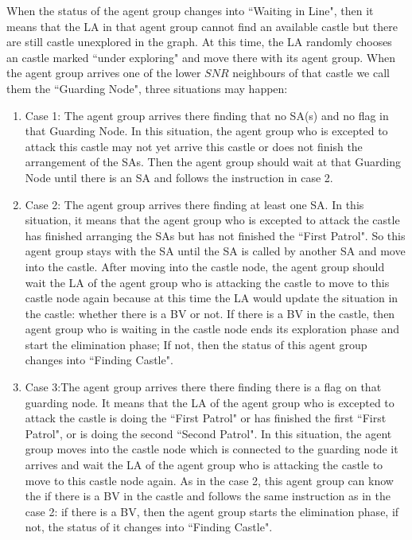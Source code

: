 When the status of the agent group changes into ``Waiting in Line", then it means that the  LA in that agent group cannot find an available castle but there are still castle unexplored in the graph. At this time, the LA  randomly chooses an  castle marked ``under exploring" and move there with its agent group. When the agent group arrives one of the lower $SNR$ neighbours of that castle we call them the ``Guarding Node", three situations may happen:
\begin{enumerate}
\item Case 1: The agent group arrives there finding that no SA(s) and no flag in that  Guarding Node. In this situation, the agent group who is excepted to attack this castle may not yet arrive this castle or does not finish the arrangement of the SAs. Then the agent group should wait at that Guarding Node until there is an SA and follows the instruction in case 2.

\item Case 2: The agent group arrives there finding at least one SA. In this situation, it means that the agent group who is excepted to attack the castle has finished arranging the SAs but has not finished the ``First Patrol". So this agent group stays with the SA until the SA is called by another SA and move into the castle. After moving into the castle node, the agent group should wait the LA of the agent group who is attacking the castle to move to this castle node again because at this time the LA would update the situation in the castle: whether there is a BV or not. If there is a BV in the castle, then agent group who is waiting in the castle node ends its exploration phase and start the elimination phase; If not, then the status of this agent group changes into ``Finding Castle".

\item Case 3:The agent group arrives there there finding there is a flag on that guarding node. It means that the LA of the agent group who is excepted to attack the castle is doing the ``First Patrol" or has finished the first ``First Patrol", or is doing the second ``Second Patrol". In this situation, the agent group moves into the castle node which is connected to the guarding node it arrives and wait the LA of the agent group who is attacking the castle to move to this castle node again. As in the case 2, this agent group can know the if there is a BV in the castle and follows the same instruction as in the case 2: if there is a BV, then the agent group starts the elimination phase, if not, the status of it changes into ``Finding Castle".

\end{enumerate}


